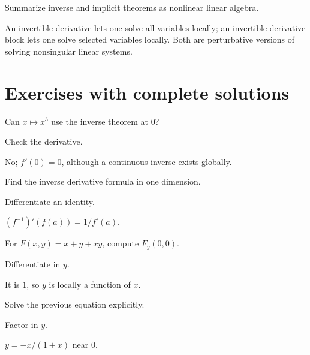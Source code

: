 \begin{problem}\label{prob:ii09-problem-12}
Summarize inverse and implicit theorems as nonlinear linear algebra.
\end{problem}
\begin{solution}
An invertible derivative lets one solve all variables locally; an invertible derivative block lets one solve selected variables locally. Both are perturbative versions of solving nonsingular linear systems.
\end{solution}

\section{Exercises with complete solutions}

\begin{exercise}\label{exr:ii09-01}
Can $x\mapsto x^3$ use the inverse theorem at $0$?
\end{exercise}
\begin{hint}
Check the derivative.
\end{hint}
\begin{solution}
No; $f'(0)=0$, although a continuous inverse exists globally.
\end{solution}

\begin{exercise}\label{exr:ii09-02}
Find the inverse derivative formula in one dimension.
\end{exercise}
\begin{hint}
Differentiate an identity.
\end{hint}
\begin{solution}
$(f^{-1})'(f(a))=1/f'(a)$.
\end{solution}

\begin{exercise}\label{exr:ii09-03}
For $F(x,y)=x+y+xy$, compute $F_y(0,0)$.
\end{exercise}
\begin{hint}
Differentiate in $y$.
\end{hint}
\begin{solution}
It is $1$, so $y$ is locally a function of $x$.
\end{solution}

\begin{exercise}\label{exr:ii09-04}
Solve the previous equation explicitly.
\end{exercise}
\begin{hint}
Factor in $y$.
\end{hint}
\begin{solution}
$y=-x/(1+x)$ near $0$.
\end{solution}

